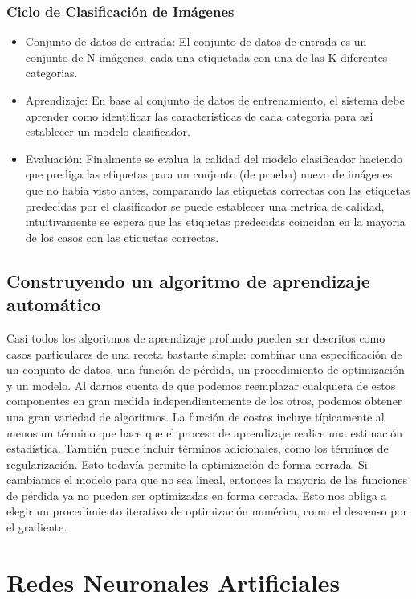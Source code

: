 \documentclass[a4paper,11pt,spanish]{book}
\begin{document}
	\subsubsection {Ciclo de Clasificación de Imágenes}
	  \begin{itemize}
	    \item Conjunto de datos de entrada: El conjunto de datos de entrada es un conjunto de N imágenes, cada una etiquetada con una de las K diferentes categorias.
	    \item Aprendizaje: En base al conjunto de datos de entrenamiento, el sistema debe aprender como identificar las caracteristicas de cada categoría para asi establecer un modelo clasificador.
	    \item Evaluación: Finalmente se evalua la calidad del modelo clasificador haciendo que prediga las etiquetas para un conjunto (de prueba) nuevo de imágenes que no habia visto antes, comparando las
	    etiquetas correctas con las etiquetas predecidas por el clasificador se puede establecer una metrica de calidad, intuitivamente se espera que las etiquetas predecidas coincidan en la mayoria
	    de los casos con las etiquetas correctas.
	  \end{itemize}
\fi


    \subsection{Construyendo un algoritmo de aprendizaje automático}
      Casi todos los algoritmos de aprendizaje profundo pueden ser descritos como casos particulares de una receta bastante simple:
      combinar una especificación de un conjunto de datos, una función de pérdida, un procedimiento de optimización y un modelo.
      Al darnos cuenta de que podemos reemplazar cualquiera de estos componentes en gran medida independientemente de los otros, podemos obtener una gran variedad de algoritmos.
      La función de costos incluye típicamente al menos un término que hace que el proceso de aprendizaje realice una estimación estadística. También puede incluir términos adicionales,
      como los términos de regularización. Esto todavía permite la optimización de forma cerrada.
      Si cambiamos el modelo para que no sea lineal, entonces la mayoría de las funciones de pérdida ya no pueden ser optimizadas en forma cerrada.
      Esto nos obliga a elegir un procedimiento iterativo de optimización numérica, como el descenso por el gradiente.

    \section{Redes Neuronales Artificiales}
\end{document}
